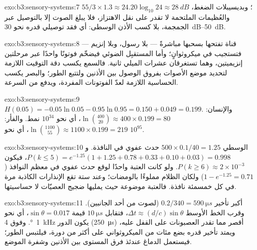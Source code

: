\begin{solution}{exo:b3:sensory-systems:7}
$55/3\times 1.3 \approx 24$؛ وبديسيبلات الضغط، $20\log_{10}24
\approx \qty{28}{dB}$. والعُظيمات الملتحمة لا تقدر على نقل
الاهتزاز، فلا يبلغ الصوت  إلا بالتوصيل عبر الجمجمة،
بلا كسب الأذن الوسطى: أي فقد توصيلي قدره نحو
\qtyrange{30}{50}{dB}.
\end{solution}

\begin{solution}{exo:b3:sensory-systems:8}
قناة  تفتحها  بسحبها مباشرةً
--- بلا رسول، وبلا إنزيم --- فتستجيب في ميكروثوانٍ؛ وأما
المستقبِل الضوئي فيضخّم فوتونًا واحدًا عبر مرحلتين
إنزيميتين، وهما تستغرقان عشرات الميلي ثانية. فالسمع يكسب
دقة التوقيت اللازمة لتحديد موضع الأصوات بفروق الوصول بين
الأذنين ولتتبع الطور؛ والبصر يكسب الحساسية اللازمة لعدّ
الفوتونات المفردة، ويدفع من السرعة.
\end{solution}

\begin{solution}{exo:b3:sensory-systems:9}
$H(0.05) = -0.05\ln 0.05 - 0.95\ln 0.95 = 0.150 + 0.049 = 0.199$.
والإنسان: $\ln\binom{400}{20} \approx 400\times 0.199 = 80$، أي نحو
$10^{34}$ نمط. والفأر: $\ln\binom{1100}{55} \approx 1100\times 0.199
= 219$، أي نحو $10^{95}$.
\end{solution}

\begin{solution}{exo:b3:sensory-systems:10}
الوسطي $500\times 0.1/40 = 1.25$ حدث عفوي في النافذة. و$P(k
\le 5) = e^{-1.25}(1 + 1.25 + 0.78 + 0.33 + 0.10 + 0.03) = 0.998$، فيكون
$P(k \ge 6) \approx 2\times 10^{-3}$. ولو كانت العتبة واحدًا
لوقع حدث عفوي في معظم النوافذ ($1 - e^{-1.25} = 0.71$) ولكان
الظلام مملوءًا بالومضات؛ وعند ستة تقع الإنذارات الكاذبة مرة
في كل خمسمئة نافذة. فالعتبة موضوعة حيث يمليها ضجيج
العصيّات لا حساسيتها.
\end{solution}

\begin{solution}{exo:b3:sensory-systems:11}
أكبر تأخير $0.2/340 = \qty{590}{\micro s}$ (لصوت من أحد
الجانبين). وقرب الخط الأوسط $\Delta t \approx (d/c)\sin\theta$، فتقابل $\qty{10}{\micro
s}$ قيمة $\sin\theta = 0.017$، أي نحو \qty{1}{\degree}. وفوق
\qty{4}{kHz} يكون الدور (\qty{250}{\micro s}) أقصر مما تقدر
العصبونات على القفل عليه، ويمتد تأخير قدره بضع مئات من
الميكروثواني على أكثر من دورة، فيلتبس الطور؛ فيستعمل الدماغ
عندئذ فرق المستوى بين الأذنين وشفرة الموضع.
\end{solution}

